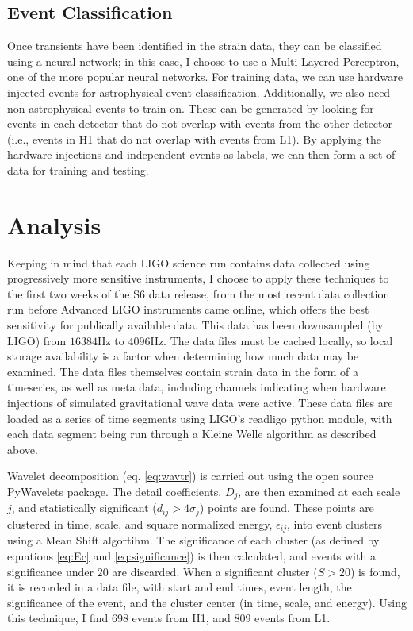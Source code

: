 \documentclass{article}
\begin{document}
\subsection{Event Classification}
Once transients have been identified in the strain data, they can be classified using a neural network; in this case, I choose to use a Multi-Layered Perceptron, one of the more popular neural networks. For training data, we can use hardware injected events for astrophysical event classification. Additionally, we also need non-astrophysical events to train on. These can be generated by looking for events in each detector that do not overlap with events from the other detector (i.e., events in H1 that do not overlap with events from L1). By applying the hardware injections and independent events as labels, we can then form a set of data for training and testing.

\section{Analysis}
Keeping in mind that each LIGO science run contains data collected using progressively more sensitive instruments, I choose to apply these techniques to the first two weeks of the S6 data release\citep{LIGOScientificCollaboration2015}, from the most recent data collection run before Advanced LIGO instruments came online, which offers the best sensitivity for publically available data. This data has been downsampled (by LIGO) from $16384\mathrm{Hz}$ to $4096\mathrm{Hz}$\citep{LIGOScientificCollaboration2015}. The data files must be cached locally, so local storage availability is a factor when determining how much data may be examined. The data files themselves contain strain data in the form of a timeseries, as well as meta data, including channels indicating when hardware injections of simulated gravitational wave data were active. These data files are loaded as a series of time segments using LIGO's readligo python module\citep{Kanner2017}, with each data segment being run through a Kleine Welle algorithm as described above.

Wavelet decomposition (eq. \ref{eq:wavtr}) is carried out using the open source PyWavelets package\citep{Wasilewski}. The detail coefficients, $D_{j}$, are then examined at each scale $j$, and statistically significant ($d_{ij} > 4\sigma_{j}$) points are found. These points are clustered in time, scale, and square normalized energy, $\epsilon_{ij}$, into event clusters using a Mean Shift algortihm. The significance of each cluster (as defined by equations \ref{eq:Ec} and \ref{eq:significance}) is then calculated, and events with a significance under $20$ are discarded. When a significant cluster ($S > 20$) is found, it is recorded in a data file, with start and end times, event length, the significance of the event, and the cluster center (in time, scale, and energy). Using this technique, I find 698 events from H1, and 809 events from L1.
\end{document}
